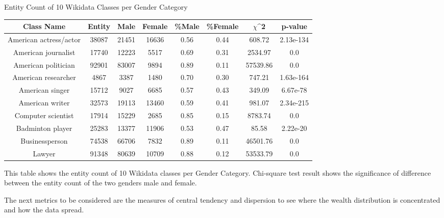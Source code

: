 \begin{center}
\small
\begin{threeparttable}
\caption{Entity Count of 10 Wikidata Classes per Gender Category}
\label{tab:gender - entity count}
\begin{tabular}{c c c c c c c c} 

\toprule
    Class Name & Entity & Male & Female & \%Male & \%Female & $\chi$^2 & p-value \\ [0.5ex] 

\midrule
    American actress/actor & 38087 & 21451 & 16636 & 0.56 & 0.44 & 608.72 & 2.13e-134 \\
    American journalist & 17740 & 12223 & 5517 & 0.69 & 0.31 & 2534.97 & 0.0 \\
    American politician & 92901 & 83007 & 9894 & 0.89 & 0.11 & 57539.86 & 0.0 \\
    American researcher & 4867 & 3387 & 1480 & 0.70 & 0.30 & 747.21 & 1.63e-164 \\
    American singer & 15712 & 9027 & 6685 & 0.57 & 0.43 & 349.09 & 6.67e-78 \\
    American writer & 32573 & 19113 & 13460 & 0.59 & 0.41 & 981.07 & 2.34e-215 \\
    Computer scientist & 17914 & 15229 & 2685 & 0.85 & 0.15 & 8783.74 & 0.0 \\
    Badminton player & 25283 & 13377 & 11906 & 0.53 & 0.47 & 85.58 & 2.22e-20 \\
    Businessperson & 74538 & 66706 & 7832 & 0.89 & 0.11 & 46501.76 & 0.0 \\
    Lawyer & 91348 & 80639 & 10709 & 0.88 & 0.12 & 53533.79 & 0.0 \\ [1ex]
\bottomrule

\end{tabular}
\begin{tablenotes}
    \footnotesize
    This table shows the entity count of 10 Wikidata classes per Gender Category. Chi-square test result shows the significance of difference between the entity count of the two genders male and female.
\end{tablenotes}

\end{threeparttable}
\end{center}

The next metrics to be considered are the measures of central tendency and dispersion to see where the wealth distribution is concentrated and how the data spread.

